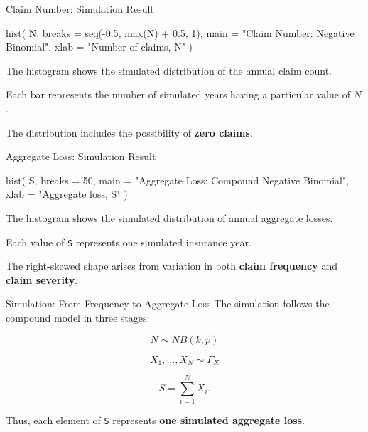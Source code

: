 \documentclass[
  ignorenonframetext,
  aspectratio=169,
]{beamer}
\newenvironment{Shaded}{\begin{snugshade}}{\end{snugshade}}
\newcommand{\AttributeTok}[1]{\textcolor[rgb]{0.40,0.45,0.13}{#1}}
\newcommand{\DecValTok}[1]{\textcolor[rgb]{0.68,0.00,0.00}{#1}}
\newcommand{\FloatTok}[1]{\textcolor[rgb]{0.68,0.00,0.00}{#1}}
\newcommand{\FunctionTok}[1]{\textcolor[rgb]{0.28,0.35,0.67}{#1}}
\newcommand{\NormalTok}[1]{\textcolor[rgb]{0.00,0.23,0.31}{#1}}
\newcommand{\SpecialCharTok}[1]{\textcolor[rgb]{0.37,0.37,0.37}{#1}}
\newcommand{\StringTok}[1]{\textcolor[rgb]{0.13,0.47,0.30}{#1}}
\begin{document}
\begin{frame}[fragile]{Claim Number: Simulation Result}
\protect{}\label{claim-number-simulation-result}
\begin{Shaded}
\begin{Highlighting}[]
\FunctionTok{hist}\NormalTok{(}
\NormalTok{  N,}
  \AttributeTok{breaks =} \FunctionTok{seq}\NormalTok{(}\SpecialCharTok{{-}}\FloatTok{0.5}\NormalTok{, }\FunctionTok{max}\NormalTok{(N) }\SpecialCharTok{+} \FloatTok{0.5}\NormalTok{, }\DecValTok{1}\NormalTok{),}
  \AttributeTok{main =} \StringTok{"Claim Number: Negative Binomial"}\NormalTok{,}
  \AttributeTok{xlab =} \StringTok{"Number of claims, N"}
\NormalTok{)}
\end{Highlighting}
\end{Shaded}

The histogram shows the simulated distribution of the annual claim
count.

Each bar represents the number of simulated years having a particular
value of \(N\).

The distribution includes the possibility of \textbf{zero claims}.
\end{frame}

\begin{frame}[fragile]{Aggregate Loss: Simulation Result}
\protect{}\label{aggregate-loss-simulation-result}
\begin{Shaded}
\begin{Highlighting}[]
\FunctionTok{hist}\NormalTok{(}
\NormalTok{  S,}
  \AttributeTok{breaks =} \DecValTok{50}\NormalTok{,}
  \AttributeTok{main =} \StringTok{"Aggregate Loss: Compound Negative Binomial"}\NormalTok{,}
  \AttributeTok{xlab =} \StringTok{"Aggregate loss, S"}
\NormalTok{)}
\end{Highlighting}
\end{Shaded}

The histogram shows the simulated distribution of annual aggregate
losses.

Each value of \texttt{S} represents one simulated insurance year.

The right-skewed shape arises from variation in both \textbf{claim
frequency} and \textbf{claim severity}.
\end{frame}

\begin{frame}[fragile]{Simulation: From Frequency to Aggregate Loss}
\protect{}\label{simulation-from-frequency-to-aggregate-loss}
The simulation follows the compound model in three stages:

\[
N\sim NB(k,p)
\]

\[
X_1,\ldots,X_N\sim F_X
\]

\[
S=\sum_{i=1}^{N}X_i.
\]

Thus, each element of \texttt{S} represents \textbf{one simulated
aggregate loss}.
\end{frame}
\end{document}
